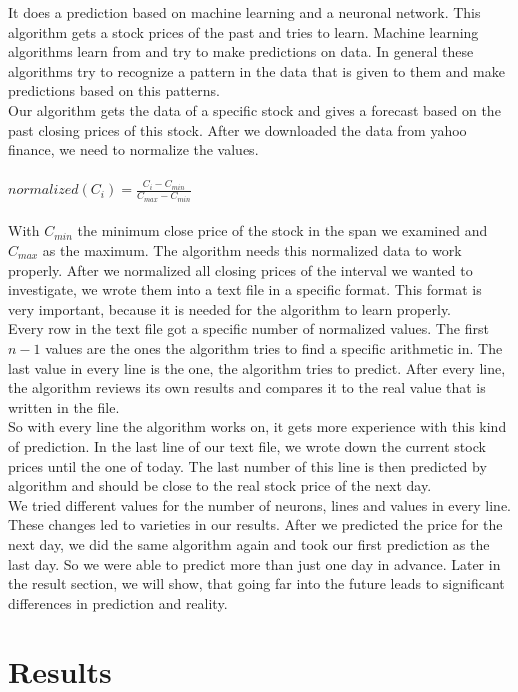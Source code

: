 \documentclass[conference]{IEEEtran}
\begin{document}
It does a prediction based on machine learning and a neuronal network. This algorithm gets a stock prices of the past and tries to learn. Machine learning algorithms learn from and try to make predictions on data. In general these algorithms try to recognize a pattern in the data that is given to them and make predictions based on this patterns.
\\
Our algorithm gets the data of a specific stock and gives a forecast based on the past closing prices of this stock. After we downloaded the data from yahoo finance, we need to normalize the values.
\\
\\
$ normalized(C_{i}) = \frac{C_{i} - C_{min}}{C_{max} - C_{min}} $
\\
\\
With $ C_{min} $ the minimum close price of the stock in the span we examined and $ C_{max} $ as the maximum. The algorithm needs this normalized data to work properly. After we normalized all closing prices of the interval we wanted to investigate, we wrote them into a text file in a specific format. This format is very important, because it is needed for the algorithm to learn properly. 
\\
Every row in the text file got a specific number of normalized values. The first $ n-1 $ values are the ones the algorithm tries to find a specific arithmetic in. The last value in every line is the one, the algorithm tries to predict. After every line, the algorithm reviews its own results and compares it to the real value that is written in the file.
\\
So with every line the algorithm works on, it gets more experience with this kind of prediction. In the last line of our text file, we wrote down the current stock prices until the one of today. The last number of this line is then predicted by algorithm and should be close to the real stock price of the next day.
\\
We tried different values for the number of neurons, lines and values in every line. These changes led to varieties in our results. After we predicted the price for the next day, we did the same algorithm again and took our first prediction as the last day. So we were able to predict more than just one day in advance. Later in the result section, we will show, that going far into the future leads to significant differences in prediction and reality.


\section{Results}
\label{results}
\end{document}
